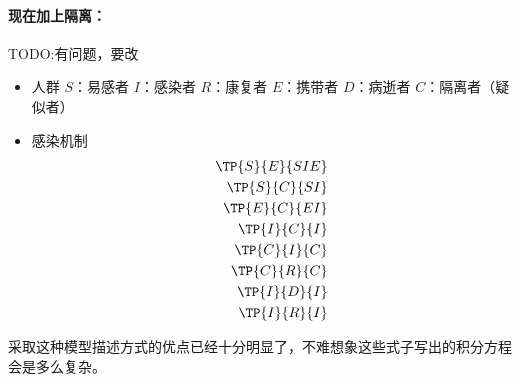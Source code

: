 \paragraph{现在加上隔离：}
TODO:有问题，要改
\begin{itemize}
	\item 人群
	\subitem $S$：易感者
	\subitem $I$：感染者
	\subitem $R$：康复者
	\subitem $E$：携带者
	\subitem $D$：病逝者
	\subitem $C$：隔离者（疑似者）
	\item 感染机制
	\subitem
	\begin{align}
	\TP{S}{E}{SIE}\\
	\TP{S}{C}{SI}\\
	\TP{E}{C}{EI}\\
	\TP{I}{C}{I}\\
	\TP{C}{I}{C}\\
	\TP{C}{R}{C}\\
	\TP{I}{D}{I}\\
	\TP{I}{R}{I}
	\end{align}
\end{itemize}
\par 采取这种模型描述方式的优点已经十分明显了，不难想象这些式子写出的积分方程会是多么复杂。
